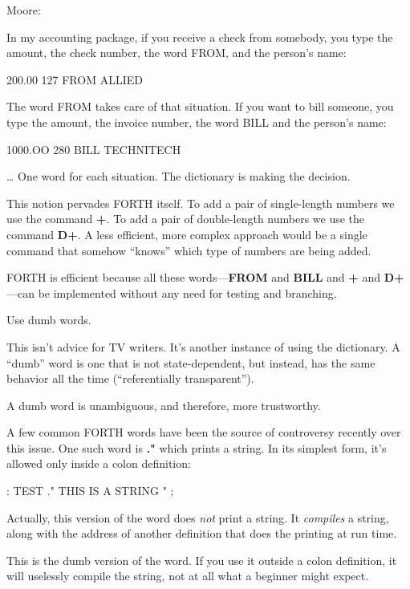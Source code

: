 \bigskip\blackline{2ex}
\noindent Moore:
\begin{tfquot}
In my accounting package, if you receive a check from somebody, you type
the amount, the check number, the word FROM, and the person's name:

\begin{Code}
200.00 127 FROM ALLIED
\end{Code}
The word FROM takes care of that situation. If you want to bill someone,
you type the amount, the invoice number, the word BILL and the person's
name:

\begin{Code}
1000.OO 280 BILL TECHNITECH
\end{Code}
\dots{} One word for each situation. The dictionary is making the decision.
\end{tfquot}\blackline{1ex}
This notion pervades FORTH itself. To add a pair of single-length
numbers we use the command \textbf{+}. To add a pair of double-length numbers
we use the command \textbf{D+}. A less efficient, more complex approach would
be a single command that somehow ``knows'' which type of numbers are
being added.

FORTH is efficient because all these words---\textbf{FROM} and \textbf{BILL} and
\textbf{+} and \textbf{D+}---can be implemented without any need for testing and
branching.

\begin{tip}
Use dumb words.
\end{tip}
This isn't advice for TV writers. It's another instance of using the
dictionary. A ``dumb'' word is one that is not state-dependent, but
instead, has the same behavior all the time (``referentially transparent'').

A dumb word is unambiguous, and therefore, more trustworthy.

A few common FORTH words have been the source of controversy
recently over this issue. One such word is \textbf{."} which prints a string.
In its simplest form, it's allowed only inside a colon definition:

\begin{Code}
: TEST   ." THIS IS A STRING " ;
\end{Code}
Actually, this version of the word does \emph{not} print a string. It
\emph{compiles} a string, along with the address of another definition
that does the printing at run time.

This is the dumb version of the word. If you use it outside a colon
definition, it will uselessly compile the string, not at all what a beginner
might expect.

